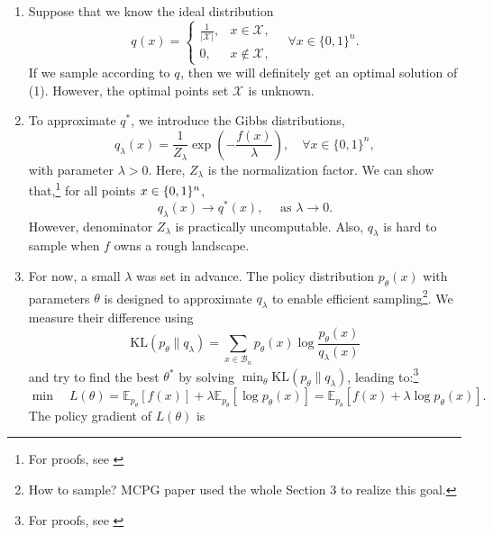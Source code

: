 \documentclass[
        11pt, %
	a4paper, %
]{LegrandOrangeBook}
\begin{document}
\begin{enumerate}
    \item Suppose that we know the ideal distribution
\begin{equation}
    q^{}(x)= 
\begin{cases}\frac{1}{\left|\mathcal{X}^{}\right|}, & x \in \mathcal{X}^{}, \\ 0, & x \notin \mathcal{X}^{},
\end{cases}  \quad \forall x \in \{0,1\}^{n}.
\end{equation}
If we sample according to $q^{}$, then we will definitely get an optimal solution of (1). However, the optimal points set $\mathcal{X}^{}$ is unknown.
    \item To approximate $q^*$, we introduce the Gibbs distributions, 
\begin{equation}
    q_\lambda(x) = \frac{1}{Z_\lambda} \exp \left(-\frac{f(x)}{\lambda}\right),  \quad \forall x \in \{0,1\}^{n},
\end{equation}
with parameter $\lambda > 0$. Here, $Z_{\lambda}$ is the normalization factor. We can show that,\footnote{For proofs, see \cite[eq. (4)]{chen2023monte}} for all points $x \in\mathcal \{0,1\}^n$, 
\begin{equation}
    q_\lambda(x) \rightarrow q^*(x), \quad \text { as } \lambda \rightarrow 0.
\end{equation}
However, denominator $Z_{\lambda}$ is practically uncomputable. Also, $q_{\lambda}$ is hard to sample when $f$ owns a rough landscape.
    \item For now, a small $\lambda$ was set in advance. The policy distribution $p_\theta(x)$ with parameters $\theta$ is designed to approximate $q_\lambda$ to enable efficient sampling\footnote{How to sample? MCPG paper used the whole Section 3 to realize this goal.}. We measure their difference using 
\begin{equation}
    \mathrm{KL}\left(p_\theta \| q_\lambda\right)=\sum_{x \in \mathcal{B}_n} p_\theta(x) \log \frac{p_\theta(x)}{q_\lambda(x)}
\end{equation}
and try to find the best $\theta^*$ by solving $\min_\theta \mathrm{KL}(p_\theta \| q_\lambda)$, leading to:\footnote{For proofs, see \cite[eq. (5)]{chen2023monte}}
\begin{equation}
    \min \quad L(\theta)=\mathbb{E}_{p_\theta}[f(x)]+\lambda \mathbb{E}_{p_\theta}[\log p_\theta(x)]=\mathbb{E}_{p_\theta}[f(x)+\lambda \log p_\theta(x)].
\end{equation}
The policy gradient of $L(\theta)$ is

\end{enumerate}
\end{document}
